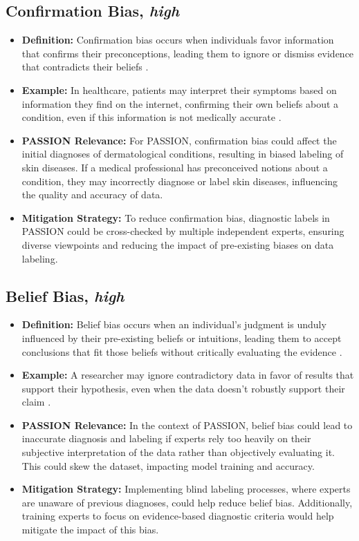 \begin{refsection}
		\subsection{Confirmation Bias, \textit{high}}
		\begin{itemize}
			\item \textbf{Definition:} Confirmation bias occurs when individuals favor information that confirms their preconceptions, leading them to ignore or dismiss evidence that contradicts their beliefs \autocite{Mester_2017}.
			\item \textbf{Example:} In healthcare, patients may interpret their symptoms based on information they find on the internet, confirming their own beliefs about a condition, even if this information is not medically accurate \autocite{Chakraborty_2024, c15, c14}.
			\item \textbf{PASSION Relevance:} For PASSION, confirmation bias could affect the initial diagnoses of dermatological conditions, resulting in biased labeling of skin diseases. If a medical professional has preconceived notions about a condition, they may incorrectly diagnose or label skin diseases, influencing the quality and accuracy of data.
			\item \textbf{Mitigation Strategy:} To reduce confirmation bias, diagnostic labels in PASSION could be cross-checked by multiple independent experts, ensuring diverse viewpoints and reducing the impact of pre-existing biases on data labeling.
		\end{itemize}
		
		\subsection{Belief Bias, \textit{high}}
		\begin{itemize}
			\item \textbf{Definition:} Belief bias occurs when an individual's judgment is unduly influenced by their pre-existing beliefs or intuitions, leading them to accept conclusions that fit those beliefs without critically evaluating the evidence \autocite{Mester_2017}.
			\item \textbf{Example:} A researcher may ignore contradictory data in favor of results that support their hypothesis, even when the data doesn't robustly support their claim \autocite{Mester_2017}.
			\item \textbf{PASSION Relevance:} In the context of PASSION, belief bias could lead to inaccurate diagnosis and labeling if experts rely too heavily on their subjective interpretation of the data rather than objectively evaluating it. This could skew the dataset, impacting model training and accuracy.
			\item \textbf{Mitigation Strategy:} Implementing blind labeling processes, where experts are unaware of previous diagnoses, could help reduce belief bias. Additionally, training experts to focus on evidence-based diagnostic criteria would help mitigate the impact of this bias.
		\end{itemize}
		

\end{refsection}
